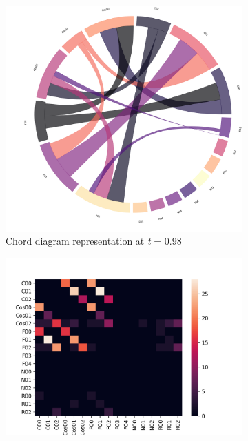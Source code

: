 \begin{figure}[!hb]
	\centering
	\begin{subfigure}[b]{0.3\linewidth}
		\includegraphics[width=\linewidth]{figures/chords/chord_swap_ensemble1000_RCN5333300_097.png}
		\caption{Chord diagram representation at \emph{t} = 0.98}
	\end{subfigure}
	\hfill
	\begin{subfigure}[b]{0.3\linewidth}
		\includegraphics[width=\linewidth]{figures/heatmaps/heatmap_swap_ensemble1000_RCN5333300_097.png}

\end{subfigure}
\end{figure}
